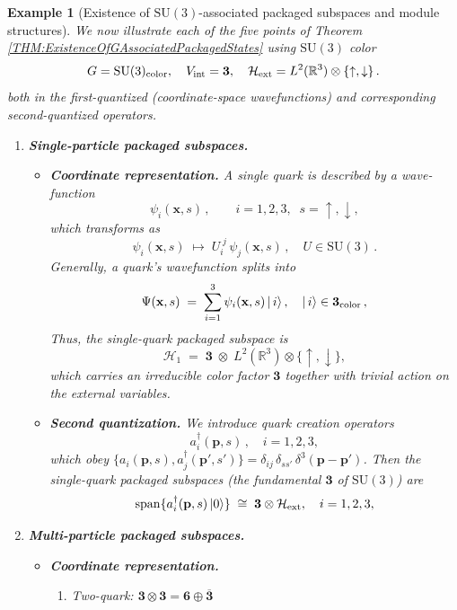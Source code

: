 \documentclass[12pt,a4paper]{article}
\newtheorem{example}{Example}
\begin{document}
\begin{example}[Existence of $\mathrm{SU}(3)$-associated packaged subspaces and module structures]
	We now illustrate each of the five points of Theorem \ref{THM:ExistenceOfGAssociatedPackagedStates} using $\mathrm{SU}(3)$ color
	$$
	G=\mathrm{SU}(3)_{\rm color},\quad V_{\rm int}=\mathbf{3},\quad \mathcal H_{\rm ext}=L^2(\mathbb R^3)\otimes\{\uparrow,\downarrow\}\,.
	$$
	both in the first-quantized (coordinate-space wavefunctions) and corresponding second-quantized operators.
	\begin{enumerate}
		\item \textbf{Single-particle packaged subspaces.}
		\begin{itemize}
			\item \textbf{Coordinate representation.}
			A single quark is described by a wave‐function		
			$$
			\psi_i(\mathbf x,s)\,,\qquad i=1,2,3,\;\;s=\uparrow,\downarrow,
			$$		
			which transforms as		
			$$
			\psi_i(\mathbf x,s)\;\longmapsto\;U_i^{\;j}\,\psi_j(\mathbf x,s)\,,\quad U\in\mathrm{SU}(3)\,.
			$$
			Generally, a quark’s wavefunction splits into		
			$$
			\Psi(\mathbf x,s)\;=\;\sum_{i=1}^3 \psi_i(\mathbf x,s) \,|\,i\rangle\,,\quad
			|\,i\rangle\in\mathbf3_{\rm color}\,,
			$$		
			Thus, the single-quark packaged subspace is		
			$$
			\mathcal H_1\;=\;\mathbf{3}\;\otimes\;L^2(\mathbb R^3)\otimes\{\!\uparrow,\downarrow\},
			$$		
			which carries an irreducible color factor $\mathbf3$ together with trivial action on the external variables.
			
			
			\item \textbf{Second quantization.}
			We introduce quark creation operators		
			$$
			a_i^\dagger(\mathbf p,s)\,,\quad i=1,2,3,
			$$		
			which obey $\{a_i(\mathbf p,s),a_j^\dagger(\mathbf p',s')\}=\delta_{ij}\,\delta_{ss'}\,\delta^3(\mathbf p-\mathbf p')$.
			Then the single-quark packaged subspaces (the fundamental $\mathbf3$ of $\mathrm{SU}(3)$) are
			$$
			\operatorname{span}
			\{a_i^\dagger(\mathbf p,s)\,\lvert0\rangle\}
			\;\cong\;
			\mathbf3\otimes\mathcal H_{\rm ext},
			\quad i=1,2,3,
			$$
		\end{itemize}
		
		
		\item \textbf{Multi-particle packaged subspaces.}
		\begin{itemize}			
			\item \textbf{Coordinate representation.}
			\begin{enumerate}
				\item Two-quark: $\mathbf3\otimes\mathbf3= \mathbf6\oplus\overline{\mathbf3}$
				

\end{enumerate}
\end{itemize}
\end{enumerate}
\end{example}
\end{document}

